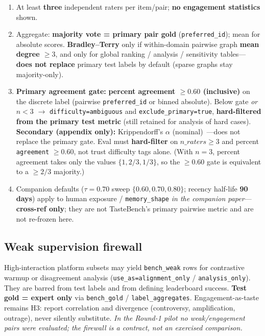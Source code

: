 \documentclass[11pt,a4paper]{article}
\begin{document}
\begin{enumerate}[leftmargin=*,itemsep=2pt]
  \item At least \textbf{three} independent raters per item/pair; \textbf{no engagement statistics} shown.
  \item Aggregate: \textbf{majority vote = primary pair gold} (\texttt{preferred\_id}); mean for absolute scores. \textbf{Bradley--Terry} only if within-domain pairwise graph \textbf{mean degree $\ge 3$}, and only for global ranking / analysis / sensitivity tables---\textbf{does not replace} primary test labels by default (sparse graphs stay majority-only).
  \item \textbf{Primary agreement gate:} \textbf{percent agreement $\ge 0.60$ (inclusive)} on the discrete label (pairwise \texttt{preferred\_id} or binned absolute). Below gate \emph{or} $n < 3$ $\rightarrow$ \texttt{difficulty=ambiguous} and \texttt{exclude\_primary=true}, \textbf{hard-filtered from the primary test metric} (still retained for analysis of hard cases). \textbf{Secondary (appendix only):} Krippendorff's $\alpha$ (nominal)~\citep{krippendorff2018content}---does not replace the primary gate. Eval must \textbf{hard-filter} on $n\_raters \ge 3$ and percent \texttt{agreement} $\ge 0.60$, not trust difficulty tags alone. (With $n=3$, percent agreement takes only the values $\{1, 2/3, 1/3\}$, so the $\ge 0.60$ gate is equivalent to a $\ge 2/3$ majority.)
  \item Companion defaults ($\tau=0.70$ sweep $\{0.60,0.70,0.80\}$; recency half-life \textbf{90 days}) apply to human exposure / \texttt{memory\_shape} \emph{in the companion paper}---\textbf{cross-ref only}; they are not TasteBench's primary pairwise metric and are not re-frozen here.
\end{enumerate}

\subsection{Weak supervision firewall}

High-interaction platform subsets may yield \texttt{bench\_weak} rows for contrastive warmup or disagreement analysis (\texttt{use\_as=alignment\_only} / \texttt{analysis\_only}). They are barred from test labels and from defining leaderboard success. \textbf{Test gold = expert only} via \texttt{bench\_gold} / \texttt{label\_aggregates}. Engagement-as-taste remains H3: report correlation and divergence (controversy, amplification, outrage), never silently substitute. \emph{In the Round-1 pilot no weak/engagement pairs were evaluated; the firewall is a contract, not an exercised comparison.}
\end{document}
